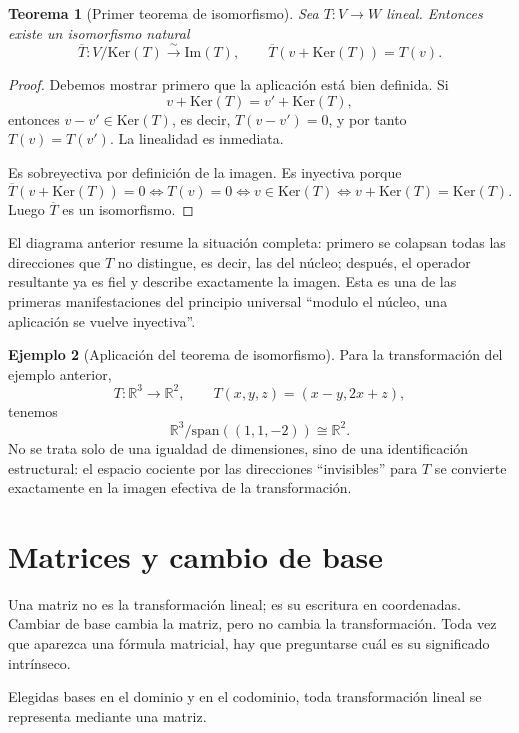 \documentclass[10pt,a4paper,oneside]{article}
\theoremstyle{plain}
\newtheorem{theorem}{Teorema}[section]
\theoremstyle{definition}
\newtheorem{example}[theorem]{Ejemplo}
\theoremstyle{remark}
\newcommand{\R}{\mathbb{R}}
\newcommand{\Ker}{\mathrm{Ker}}
\newcommand{\Ima}{\mathrm{Im}}
\newcommand{\Span}{\mathrm{span}}
\begin{document}
\begin{theorem}[Primer teorema de isomorfismo]
Sea \(T:V\to W\) lineal. Entonces existe un isomorfismo natural
\[
\overline{T}:V/\Ker(T)\xrightarrow{\sim}\Ima(T),
\qquad
\overline{T}(v+\Ker(T))=T(v).
\]
\end{theorem}

\begin{proof}
Debemos mostrar primero que la aplicación está bien definida. Si
\[
v+\Ker(T)=v'+\Ker(T),
\]
entonces \(v-v'\in\Ker(T)\), es decir, \(T(v-v')=0\), y por tanto \(T(v)=T(v')\). La linealidad es inmediata.

Es sobreyectiva por definición de la imagen. Es inyectiva porque
\[
\overline{T}(v+\Ker(T))=0
\iff
T(v)=0
\iff
v\in\Ker(T)
\iff
v+\Ker(T)=\Ker(T).
\]
Luego \(\overline{T}\) es un isomorfismo. \end{proof}

\begin{center}
\end{center}

\begin{intuitionBox}
El diagrama anterior resume la situación completa: primero se colapsan todas las direcciones que \(T\) no distingue, es decir, las del núcleo; después, el operador resultante ya es fiel y describe exactamente la imagen. Esta es una de las primeras manifestaciones del principio universal ``modulo el núcleo, una aplicación se vuelve inyectiva''.
\end{intuitionBox}

\begin{example}[Aplicación del teorema de isomorfismo]
Para la transformación del ejemplo anterior,
\[
T:\R^3\to\R^2,
\qquad
T(x,y,z)=(x-y,2x+z),
\]
tenemos
\[
\R^3/\Span((1,1,-2))\cong\R^2.
\]
No se trata solo de una igualdad de dimensiones, sino de una identificación estructural: el espacio cociente por las direcciones ``invisibles'' para \(T\) se convierte exactamente en la imagen efectiva de la transformación.
\end{example}

\section{Matrices y cambio de base}
\begin{warningBox}
Una matriz no es la transformación lineal; es su escritura en coordenadas. Cambiar de base cambia la matriz, pero no cambia la transformación. Toda vez que aparezca una fórmula matricial, hay que preguntarse cuál es su significado intrínseco.
\end{warningBox}
Elegidas bases en el dominio y en el codominio, toda transformación lineal se representa mediante una matriz.
\end{document}

